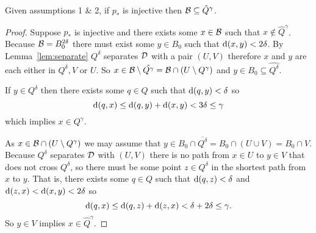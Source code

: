 \begin{lemma}\label{lem:qcontain}
    Given assumptions 1 \& 2, if $p_*$ is injective then ${\mathcal{B}}\subseteq \hat{Q}^\gamma$.
\end{lemma}
\begin{proof}
    Suppose $p_*$ is injective and there exists some $x\in {\mathcal{B}}$ such that $x\notin \hat{Q}^\gamma$.
    Because ${\mathcal{B}} = B_0^{2\delta}$ there must exist some $y\in B_0$ such that $\mathrm{d}(x, y) < 2\delta$.
    By Lemma~\ref{lem:separate} $Q^\delta$ separates ${\mathcal{D}}$ with a pair $(U, V)$ therefore $x$ and $y$ are each either in $Q^\delta, V$ or $U$.
    So $x\in{\mathcal{B}}\setminus \hat{Q^\gamma} = {\mathcal{B}}\cap (U\setminus Q^\gamma)$ and $y\in B_0\subseteq\hat{Q^\delta}$.

    If $y\in Q^\delta$ then there exists some $q\in Q$ such that $\mathrm{d}(q, y) < \delta$ so
    \[ \mathrm{d}(q, x)\leq \mathrm{d}(q, y) + \mathrm{d}(x, y) < 3\delta\leq\gamma \]
    which implies $x \in Q^\gamma$.


    As $x\in {\mathcal{B}}\cap (U\setminus Q^\gamma)$ we may assume that $y\in B_0 \cap \overline{Q^\delta} = B_0 \cap (U\cup V) = B_0 \cap V$.
    Because $Q^\delta$ separates ${\mathcal{D}}$ with $(U, V)$ there is no path from $x\in U$ to $y\in V$ that does not cross $Q^\delta$, so there must be some point $z\in Q^\delta$ in the shortest path from $x$ to $y$.
    That is, there exists some $q\in Q$ such that $\mathrm{d}(q, z) < \delta$ and $\mathrm{d}(z, x) < \mathrm{d}(x, y) < 2\delta$ so
    \[ \mathrm{d}(q, x)\leq \mathrm{d}(q, z) + \mathrm{d}(z, x) < \delta + 2\delta \leq \gamma. \]
    So $y\in V$ implies $x\in\hat{Q}^\gamma$.
\end{proof}


